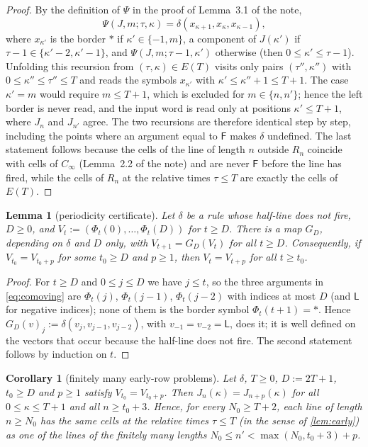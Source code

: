 \documentclass[11pt]{article}
\newtheorem{lemma}[theorem]{Lemma}
\newtheorem{corollary}[theorem]{Corollary}
\theoremstyle{definition}
\theoremstyle{remark}
\newcommand{\Lq}{\mathsf L}
\newcommand{\Fq}{\mathsf F}
\begin{document}
\begin{proof}
By the definition of $\Psi$ in the proof of Lemma~3.1 of the note,
\[
\Psi(J,m;\tau,\kappa)=\delta(x_{\kappa+1},x_\kappa,x_{\kappa-1}),
\]
where $x_{\kappa'}$ is the border $\ast$ if $\kappa'\in\{-1,m\}$, a component of
$J(\kappa')$ if $\tau-1\in\{\kappa'-2,\kappa'-1\}$, and
$\Psi(J,m;\tau-1,\kappa')$ otherwise (then $0\le\kappa'\le\tau-1$). Unfolding
this recursion from $(\tau,\kappa)\in E(T)$ visits only pairs
$(\tau'',\kappa'')$ with $0\le\kappa''\le\tau''\le T$ and reads the symbols
$x_{\kappa'}$ with $\kappa'\le\kappa''+1\le T+1$. The case $\kappa'=m$ would
require $m\le T+1$, which is excluded for $m\in\{n,n'\}$; hence the left border
is never read, and the input word is read only at positions $\kappa'\le T+1$,
where $J_n$ and $J_{n'}$ agree. The two recursions are therefore identical step
by step, including the points where an argument equal to $\Fq$ makes $\delta$
undefined. The last statement follows because the cells of the line of length
$n$ outside $R_n$ coincide with cells of $C_\infty$ (Lemma~2.2 of the note) and
are never $\Fq$ before the line has fired, while the cells of $R_n$ at the
relative times $\tau\le T$ are exactly the cells of $E(T)$.
\end{proof}

\begin{lemma}[periodicity certificate]\label{lem:certificate}
Let $\delta$ be a rule whose half-line does not fire, $D\ge0$, and
$V_t:=(\Phi_t(0),\dots,\Phi_t(D))$ for $t\ge D$. There is a map $G_D$, depending
on $\delta$ and $D$ only, with $V_{t+1}=G_D(V_t)$ for all $t\ge D$. Consequently,
if $V_{t_0}=V_{t_0+p}$ for some $t_0\ge D$ and $p\ge1$, then $V_t=V_{t+p}$ for
all $t\ge t_0$.
\end{lemma}

\begin{proof}
For $t\ge D$ and $0\le j\le D$ we have $j\le t$, so the three arguments in
\eqref{eq:comoving} are $\Phi_t(j)$, $\Phi_t(j-1)$, $\Phi_t(j-2)$ with indices at
most $D$ (and $\Lq$ for negative indices); none of them is the border symbol
$\Phi_t(t+1)=\ast$. Hence $G_D(v)_j:=\delta(v_j,v_{j-1},v_{j-2})$, with
$v_{-1}=v_{-2}=\Lq$, does it; it is well defined on the vectors that occur
because the half-line does not fire. The second statement follows by induction
on $t$.
\end{proof}

\begin{corollary}[finitely many early-row problems]\label{cor:reduce}
Let $\delta$, $T\ge0$, $D:=2T+1$, $t_0\ge D$ and $p\ge1$ satisfy
$V_{t_0}=V_{t_0+p}$. Then $J_n(\kappa)=J_{n+p}(\kappa)$ for all
$0\le\kappa\le T+1$ and all $n\ge t_0+3$. Hence, for every $N_0\ge T+2$, each
line of length $n\ge N_0$ has the same cells at the relative times $\tau\le T$
(in the sense of \cref{lem:early}) as one of the lines of the finitely many
lengths $N_0\le n'<\max(N_0,t_0+3)+p$.
\end{corollary}
\end{document}
